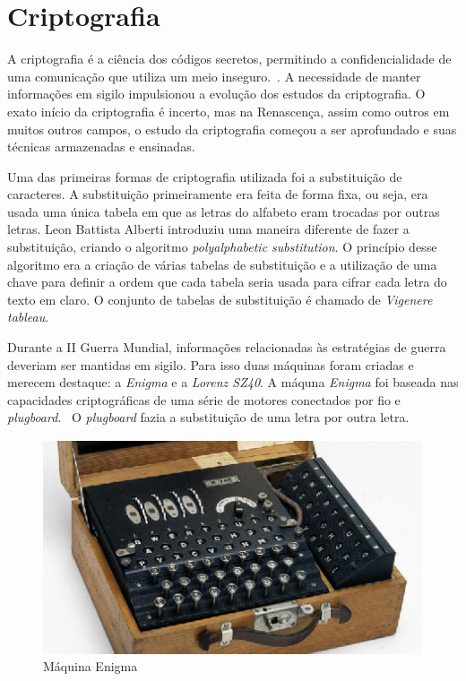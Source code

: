 \chapter{Criptografia}
\label{cryptograhy}

%
A criptografia é a ciência dos códigos secretos, permitindo a confidencialidade de uma comunicação que utiliza um meio inseguro.~\cite{vauldenay}. A necessidade de manter informações em sigilo impulsionou a evolução dos estudos da criptografia. O exato início da criptografia é incerto, mas na Renascença, assim como outros em muitos outros campos, o estudo da criptografia começou a ser aprofundado e suas técnicas armazenadas e ensinadas. \cite{donald-davies}

%
Uma das primeiras formas de criptografia utilizada foi a substituição de caracteres. A substituição primeiramente era feita de forma fixa, ou seja, era usada uma única tabela em que as letras do alfabeto eram trocadas por outras letras. Leon Battista Alberti introduziu uma maneira diferente de fazer a substituição, criando o algoritmo \textit{polyalphabetic substitution}. O princípio desse algoritmo era a criação de várias tabelas de substituição e a utilização de uma chave para definir a ordem que cada tabela seria usada para cifrar cada letra do texto em claro. O conjunto de tabelas de substituição é chamado de \textit{Vigenere tableau}.


%
Durante a II Guerra Mundial, informações relacionadas às estratégias de guerra deveriam ser mantidas em sigilo. Para isso duas máquinas foram criadas e merecem destaque: a \textit{Enigma} e a \textit{Lorenz SZ40}. A máquna \textit{Enigma} foi baseada nas capacidades criptográficas de uma série de motores conectados por fio e \textit{plugboard}.~\cite{jennifer-wilcox} O \textit{plugboard} fazia a substituição de uma letra por outra letra. 
\begin{figure}[h]
\centering
  \includegraphics[keepaspectratio=true,scale=2]
  {figuras/enigma.eps}
  \caption[{Máquina Enigma}]{Máquina Enigma\protect\footnotemark}
  \label{enigma-machine}
\end{figure}

